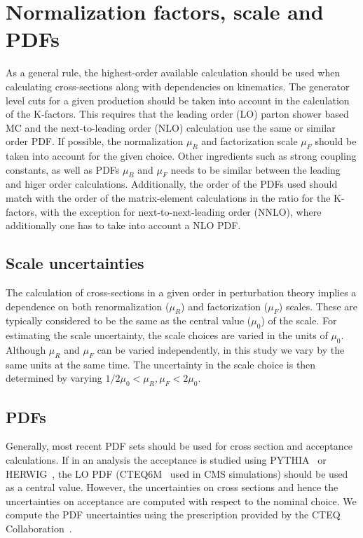 \section{Normalization factors, scale and PDFs}
\label{sec:normalization}
As a general rule, the highest-order available calculation should be used when 
calculating cross-sections along with dependencies on kinematics. The generator 
level cuts for a given production should be taken into account in the 
calculation of the K-factors. This requires that the leading order (LO) parton 
shower based MC and the next-to-leading order (NLO) calculation use the same 
or similar order PDF. If possible, the normalization $\mu_R$ and factorization 
scale $\mu_F$ should be taken into account for the given choice. Other 
ingredients such as strong coupling constants, as well as PDFs $\mu_R$ and 
$\mu_F$ needs to be similar between the leading and higer order calculations. 
Additionally, the order of the PDFs used should match with the order of the 
matrix-element calculations in the ratio for the K-factors, with the exception 
for next-to-next-leading order (NNLO), where additionally one has to take 
into account a NLO PDF. 

\subsection{Scale uncertainties}

The calculation of cross-sections in a given order in perturbation theory 
implies a dependence on both renormalization ($\mu_R$) and factorization 
($\mu_F$) scales. These are typically considered to be the same as the central 
value ($\mu_0$) of the scale.  For estimating the scale uncertainty, the scale 
choices are varied in the units of $\mu_0$. Although $\mu_R$ and $\mu_F$ can 
be varied independently, in this study we vary by the same units at the same 
time. The uncertainty in the scale choice is then determined by varying 
$1/2 \mu_0 < \mu_R, \mu_F < 2\mu_0$. 

\subsection{PDFs}
Generally, most recent PDF sets should be used for cross section and 
acceptance calculations. If in an analysis the acceptance is studied using 
PYTHIA~\cite{Pythia} or HERWIG~\cite{Herwig}, the LO PDF (CTEQ6M~\cite{cteq6m} 
used in CMS simulations) should be used as a central value. However, the 
uncertainties on cross sections and hence the uncertainties on acceptance are 
computed with respect to the nominal choice. We compute the PDF uncertainties 
using the prescription provided by the CTEQ Collaboration~\cite{cteq6m}. 

